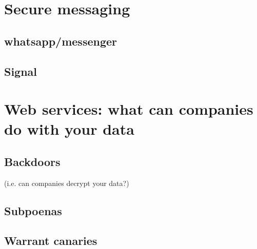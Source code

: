 \documentclass{article}
\begin{document}
\section{Secure messaging}
\subsection{whatsapp/messenger}
\subsection{Signal}

\section{Web services: what can companies do with your data}
\subsection{Backdoors} 
(i.e. can companies decrypt your data?)
\subsection{Subpoenas}
\subsection{Warrant canaries}
\end{document}
